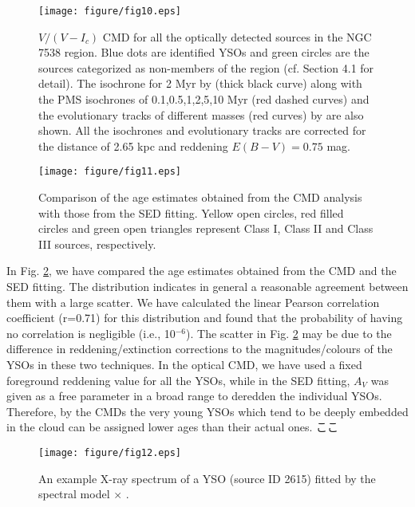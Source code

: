 \documentclass[a4paper,fleqn,usenatbib,useAMS]{mnras}
\begin{document}
\begin{figure}
\centering\texttt{[image: figure/fig10.eps]}
\caption{\label{vi} $V/(V-I_c)$ CMD for all the optically detected sources in the NGC 7538 region.
Blue dots are identified YSOs and green circles are the sources categorized as 
non-members of the region  (cf. Section 4.1 for detail).
The isochrone for 2 Myr by \citet{2008AA...482..883M}  (thick black curve) along with the PMS isochrones
of 0.1,0.5,1,2,5,10 Myr (red dashed curves) and the evolutionary tracks of different masses 
(red curves)  by \citet{2000AA...358..593S} are also shown.
All the isochrones and evolutionary tracks are corrected for the distance of 2.65 kpc and reddening $E(B-V)=0.75$ mag.
}
\end{figure}


\begin{figure}
\centering\texttt{[image: figure/fig11.eps]}
\caption{\label{cmp} Comparison of the age estimates obtained from the 
CMD analysis with those from the SED fitting.
Yellow open circles, red filled circles and green open triangles 
represent Class I, Class II  and Class III sources, respectively.}
\end{figure}


In Fig. \ref{cmp}, we have compared the age estimates obtained from the CMD and the SED fitting. 
The distribution indicates in general a reasonable agreement between them with a large scatter.
We have calculated the linear Pearson correlation coefficient (r=0.71) for this distribution
and found that the probability of having no correlation is negligible (i.e., 10$^{-6}$). 
The scatter in Fig. \ref{cmp} may be due to the difference in reddening/extinction corrections to 
the magnitudes/colours of the YSOs in these two techniques.
In the optical CMD, we have used a fixed foreground reddening value for all the YSOs,
while in the SED fitting, $A_V$ was given as a free parameter in a broad range to deredden the individual YSOs. Therefore, by the CMDs the very young YSOs 
which tend to be deeply embedded in the cloud can be assigned lower ages than their actual ones.
ここ

\begin{figure}
\centering\texttt{[image: figure/fig12.eps]}
\caption{\label{spectra} An example X-ray spectrum of a YSO (source ID 2615) fitted by the spectral model 
 {} $\times$ {}. 
}
\end{figure}
\end{document}
